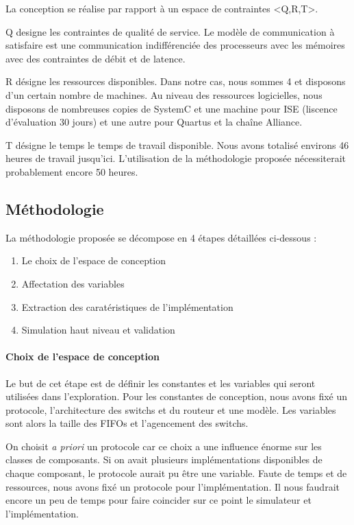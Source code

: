 \documentclass[11pt]{article}
\begin{document}
La conception se réalise par rapport à un espace de contraintes <Q,R,T>.

Q designe les contraintes de qualité de service. Le modèle de communication à satisfaire est une communication indifférenciée des processeurs avec les mémoires avec des contraintes de débit et de latence.

R désigne les ressources disponibles. Dans notre cas, nous sommes 4 et disposons d'un certain nombre de machines. Au niveau des ressources logicielles, nous disposons de nombreuses copies de SystemC et une machine pour ISE (liscence d'évaluation 30 jours) et une autre pour Quartus et la chaîne Alliance.

T désigne le temps le temps de travail disponible. Nous avons totalisé environs 46 heures de travail jusqu'ici. L'utilisation de la méthodologie proposée nécessiterait probablement encore 50 heures.

\subsection{Méthodologie}

La méthodologie proposée se décompose en 4 étapes détaillées ci-dessous :
\begin{enumerate}
\item Le choix de l'espace de conception
\item Affectation des variables
\item Extraction des caratéristiques de l'implémentation
\item Simulation haut niveau et validation
\end{enumerate}

\paragraph{Choix de l'espace de conception}
Le but de cet étape est de définir les constantes et les variables qui seront utilisées dans l'exploration. Pour les constantes de conception, nous avons fixé un protocole, l'architecture des switchs et du routeur et une modèle. Les variables sont alors la taille des FIFOs et l'agencement des switchs.

On choisit \textit{a priori} un protocole car ce choix a une influence énorme sur les classes de composants. Si on avait plusieurs implémentations disponibles de chaque composant, le protocole aurait pu être une variable. Faute de temps et de ressources, nous avons fixé un protocole pour l'implémentation. Il nous faudrait encore un peu de temps pour faire coincider sur ce point le simulateur et l'implémentation.
\end{document}
